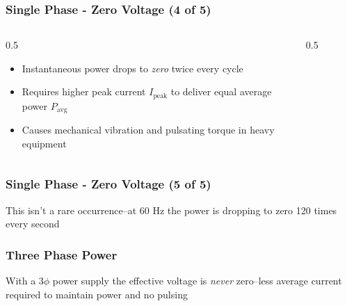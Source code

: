 \begin{frame}
    \frametitle{Single Phase - Zero Voltage (4 of 5)}

    \begin{columns}
        \begin{column}{0.5\linewidth}
            \begin{itemize}
                \item Instantaneous power drops to \emph{zero} twice every cycle
                \item Requires higher peak current $I_{\text{peak}}$ to deliver equal average power $P_{\text{avg}}$
                \item Causes mechanical vibration and pulsating torque in heavy equipment
            \end{itemize}
        \end{column}
        \begin{column}{0.5\linewidth}
            \begin{figure}
                \centering
                \resizebox{\columnwidth}{!}{
                    
                }
            \end{figure}
        \end{column}
    \end{columns}
\end{frame}

\begin{frame}
    \frametitle{Single Phase - Zero Voltage (5 of 5)}

    \begin{figure}
        \centering
        \resizebox{0.75\linewidth}{!}{
            
        }
    \end{figure}

    \centering
    \vspace{0.5em}
    {\footnotesize This isn't a rare occurrence--at 60 Hz the power is dropping to zero 120 times every second\par}
\end{frame}

\begin{frame}
    \frametitle{Three Phase Power}

    \begin{figure}
        \centering
        \resizebox{0.75\linewidth}{!}{
            
        }
    \end{figure}

    \centering
    \vspace{0.5em}
    {\footnotesize With a 3$\phi$ power supply the effective voltage is \emph{never} zero--less average current required to maintain power and no pulsing\par}
\end{frame}

